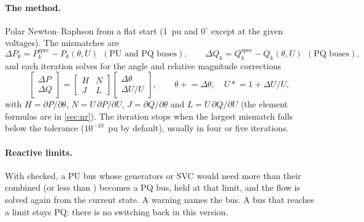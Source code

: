 \paragraph{The method.} Polar Newton--Raphson from a flat start (1~pu and $0^\circ$
except at the given voltages). The mismatches are
\[
  \Delta P_k = P_k^\text{spec} - P_k(\theta, U) \ \ (\text{PU and PQ buses}),\qquad
  \Delta Q_k = Q_k^\text{spec} - Q_k(\theta, U) \ \ (\text{PQ buses}),
\]
and each iteration solves for the angle and relative magnitude corrections
\[
  \begin{bmatrix} \Delta P \\ \Delta Q \end{bmatrix} =
  \begin{bmatrix} H & N \\ J & L \end{bmatrix}
  \begin{bmatrix} \Delta\theta \\ \Delta U/U \end{bmatrix}, \qquad
  \theta \mathrel{+}= \Delta\theta, \quad U \mathrel{*}= 1 + \Delta U/U,
\]
with $H = \partial P/\partial\theta$, $N = U\,\partial P/\partial U$, $J = \partial
Q/\partial\theta$ and $L = U\,\partial Q/\partial U$ (the element formulas are in
\cref{sec:nr}). The iteration stops when the largest mismatch falls below the tolerance
($10^{-10}$~pu by default), usually in four or five iterations.

\paragraph{Reactive limits.} With  checked, a PU bus whose
generators or SVC would need more than their combined  (or less than ) becomes a PQ bus, held at that limit, and the flow is solved again from the current
state. A warning names the bus. A bus that reaches a limit stays PQ: there is no
switching back in this version.

